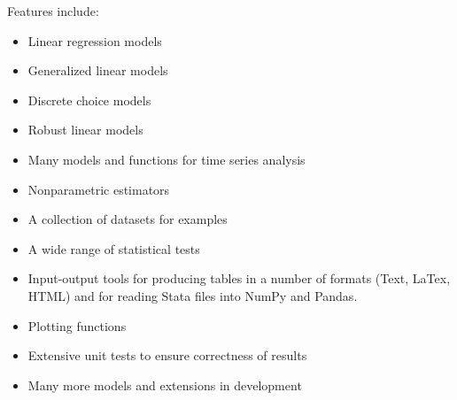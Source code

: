\documentclass[KSmain.tex]{subfiles}
\begin{document}
Features include:


\begin{itemize}

\item Linear regression models

\item Generalized linear models

\item Discrete choice models

\item Robust linear models

\item Many models and functions for time series analysis

\item Nonparametric estimators

\item A collection of datasets for examples

\item A wide range of statistical tests

\item Input-output tools for producing tables in a number of formats (Text, LaTex, HTML) and for reading Stata files into NumPy and Pandas.

\item Plotting functions

\item Extensive unit tests to ensure correctness of results

\item Many more models and extensions in development

\end{itemize}
\end{document}
